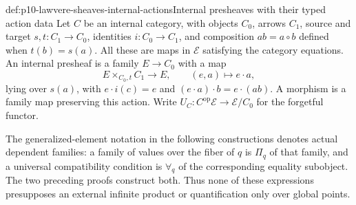 \begin{hbdefinition}{def:p10-lawvere-sheaves-internal-actions}{Internal presheaves with their typed action data}
Let \(C\) be an internal category, with objects \(C_0\), arrows
\(C_1\), source and target \(s,t:C_1\to C_0\), identities
\(i:C_0\to C_1\), and composition \(a b=a\circ b\)
defined when \(t(b)=s(a)\).  All these are maps in
\(\mathcal E\) satisfying the category equations.  An internal
presheaf is a family \(E\to C_0\) with a map
\[
  E\times_{C_0,t}C_1\longrightarrow E,
             \qquad(e,a)\longmapsto e\cdot a,
\]
lying over \(s(a)\), with
\(e\cdot i(c)=e\) and
\((e\cdot a)\cdot b=e\cdot(a b)\).
A morphism is a family map preserving this action.  Write
\(U_C:C^{\mathrm{op}}\mathcal E\to\mathcal E/C_0\)
for the forgetful functor.

The generalized-element notation in the following constructions
denotes actual dependent families: a family of values over the
fiber of \(q\) is \(\Pi_q\) of that family, and a universal
compatibility condition is \(\forall_q\) of the corresponding
equality subobject.  The two preceding proofs construct both.
Thus none of these expressions presupposes an external infinite
product or quantification only over global points.
\end{hbdefinition}


